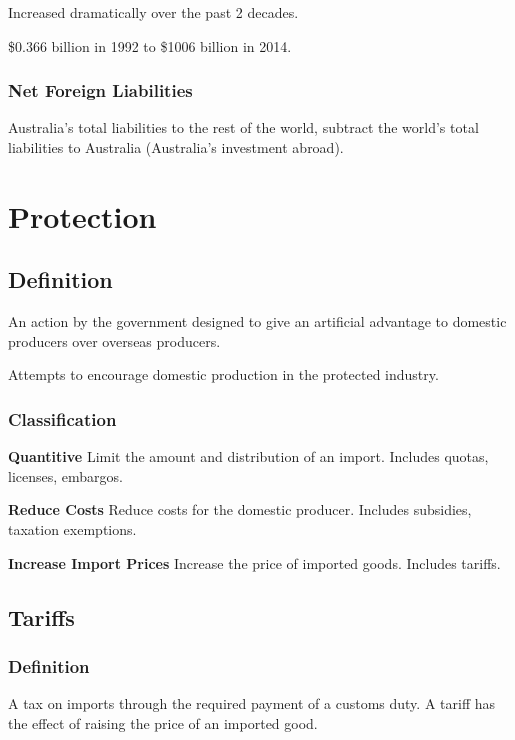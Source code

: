 \documentclass[a4paper,11pt]{report}
\begin{document}
Increased dramatically over the past 2 decades.

\$0.366 billion in 1992 to \$1006 billion in 2014.

\subsection{Net Foreign Liabilities}

Australia's total liabilities to the rest of the world, subtract the world's
total liabilities to Australia (Australia's investment abroad).




\chapter{Protection}

\section{Definition}

An action by the government designed to give an artificial advantage to
domestic producers over overseas producers.

Attempts to encourage domestic production in the protected industry.

\subsection{Classification}

\textbf{Quantitive} \quad Limit the amount and distribution of an import.
Includes quotas, licenses, embargos.

\textbf{Reduce Costs} \quad Reduce costs for the domestic producer. Includes
subsidies, taxation exemptions.

\textbf{Increase Import Prices} \quad Increase the price of imported goods.
Includes tariffs.


\section{Tariffs}

\subsection{Definition}

A tax on imports through the required payment of a customs duty. A tariff has
the effect of raising the price of an imported good.
\end{document}
